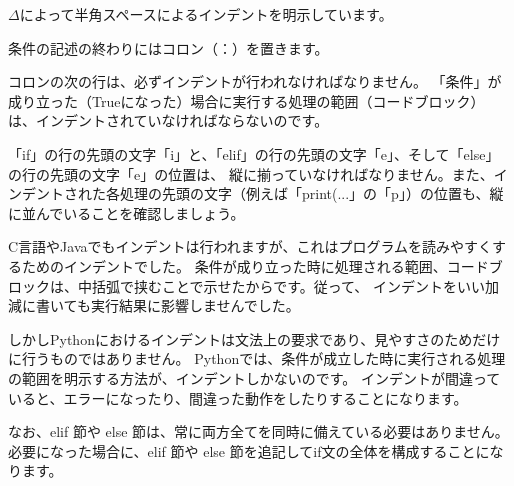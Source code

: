 \documentclass[uplatex,a4paper,11pt,oneside,openany]{jsbook}
\begin{document}
$\Delta$によって半角スペースによるインデントを明示しています。

条件の記述の終わりにはコロン（：）を置きます。

コロンの次の行は、必ずインデントが行われなければなりません。
「条件」が成り立った（Trueになった）場合に実行する処理の範囲（コードブロック）は、インデントされていなければならないのです。

「if」の行の先頭の文字「i」と、「elif」の行の先頭の文字「e」、そして「else」の行の先頭の文字「e」の位置は、
縦に揃っていなければなりません。また、インデントされた各処理の先頭の文字（例えば「print(...」の「p」）の位置も、縦に並んでいることを確認しましょう。

C言語やJavaでもインデントは行われますが、これはプログラムを読みやすくするためのインデントでした。
条件が成り立った時に処理される範囲、コードブロックは、中括弧で挟むことで示せたからです。従って、
インデントをいい加減に書いても実行結果に影響しませんでした。

しかしPythonにおけるインデントは文法上の要求であり、見やすさのためだけに行うものではありません。
Pythonでは、条件が成立した時に実行される処理の範囲を明示する方法が、インデントしかないのです。
インデントが間違っていると、エラーになったり、間違った動作をしたりすることになります。

なお、elif 節や else 節は、常に両方全てを同時に備えている必要はありません。
必要になった場合に、elif 節や else 節を追記してif文の全体を構成することになります。
\end{document}
